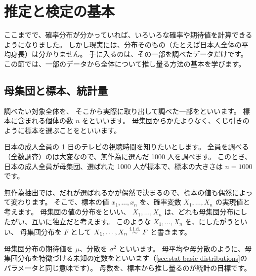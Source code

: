 \section{推定と検定の基本}
\label{sec:stat-estimation-testing-basics}

ここまでで、確率分布が分かっていれば、いろいろな確率や期待値を計算できるようになりました。
しかし現実には、分布そのもの（たとえば日本人全体の平均身長）は分かりません。
手に入るのは、その一部を調べたデータだけです。
この節では、一部のデータから全体について推し量る方法の基本を学びます。

\subsection{母集団と標本、統計量}

調べたい対象全体を、
そこから実際に取り出して調べた一部をといいます。
標本に含まれる個体の数 $n$ をといいます。
母集団からかたよりなく、くじ引きのように標本を選ぶことをといいます。

\begin{example}
  日本の成人全員の 1 日のテレビの視聴時間を知りたいとします。
  全員を調べる（全数調査）のは大変なので、無作為に選んだ 1000 人を調べます。
  このとき、日本の成人全員が母集団、選ばれた 1000 人が標本で、標本の大きさは $n = 1000$ です。
\end{example}

無作為抽出では、だれが選ばれるかが偶然で決まるので、標本の値も偶然によって変わります。
そこで、標本の値 $x_1, \dots, x_n$ を、確率変数 $X_1, \dots, X_n$ の実現値と考えます。
母集団の値の分布をといい、
$X_1, \dots, X_n$ は、どれも母集団分布にしたがい、互いに独立だと考えます。
このような $X_1, \dots, X_n$ を、にしたがうといい、
母集団分布を $F$ として $X_1, \dots, X_n \overset{\text{i.i.d.}}{\sim} F$ と書きます。

母集団分布の期待値を $\mu$、分散を $\sigma^2$ といいます。
母平均や母分散のように、母集団分布を特徴づける未知の定数をといいます（\cref{sec:stat-basic-distributions}のパラメータと同じ意味です）。
母数を、標本から推し量るのが統計の目標です。

